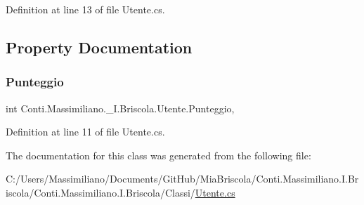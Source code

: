 Definition at line 13 of file Utente.\+cs.



\subsection{Property Documentation}
\hypertarget{class_conti_1_1_massimiliano_1_1__5_i_1_1_briscola_1_1_utente_a8cef4b6a0f28f1a24146c874556b99a1}{}\label{class_conti_1_1_massimiliano_1_1__5_i_1_1_briscola_1_1_utente_a8cef4b6a0f28f1a24146c874556b99a1} 
\subsubsection{\texorpdfstring{Punteggio}{Punteggio}}
{\footnotesize\ttfamily int Conti.\+Massimiliano.\+\_\+I.\+Briscola.\+Utente.\+Punteggio\hspace{0.3cm}{\ttfamily [get]}, {\ttfamily [set]}}



Definition at line 11 of file Utente.\+cs.



The documentation for this class was generated from the following file\+:\begin{DoxyCompactItemize}
\item 
C\+:/\+Users/\+Massimiliano/\+Documents/\+Git\+Hub/\+Mia\+Briscola/\+Conti.\+Massimiliano.\+I.\+Briscola/\+Conti.\+Massimiliano.\+I.\+Briscola/\+Classi/\hyperlink{_utente_8cs}{Utente.\+cs}\end{DoxyCompactItemize}
